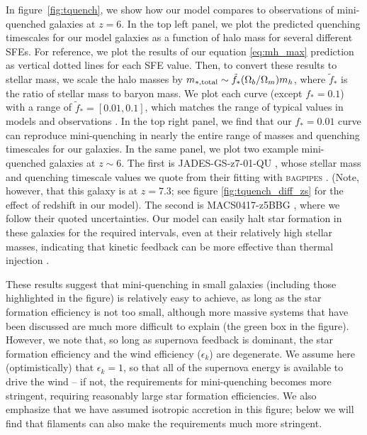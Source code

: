 \documentclass[a4paper,11pt]{article}
\begin{document}
In figure~\ref{fig:tquench}, we show how our model compares to observations of mini-quenched galaxies at $z=6$. In the top left panel, we plot the predicted quenching timescales for our model galaxies as a function of halo mass for several different SFEs. For reference, we plot the results of our equation \ref{eq:mh_max} prediction as vertical dotted lines for each SFE value. Then, to convert these results to stellar mass, we scale the halo masses by $m_{*, \rm total} \sim \tilde{f}_{*} (\Omega_{b}/\Omega_{m}) m_{h}$, where $\tilde{f}_{*}$ is the ratio of stellar mass to baryon mass. We plot each curve (except $f_{*} = 0.1$) with a range of $\tilde{f}_{*} = [0.01,0.1]$, which matches the range of typical values in models \cite{Diemer2015_colossus1, Furlanetto2017_minimalist, Prada2026} and observations \cite{Finkelstein2015}. 
In the top right panel, we find that our $f_{*} = 0.01$ curve can reproduce mini-quenching in nearly the entire range of masses and quenching timescales for our galaxies. In the same panel, we plot two example mini-quenched galaxies at $z \sim 6$. The first is JADES-GS-z7-01-QU \cite{Looser2024}, whose stellar mass and quenching timescale values we quote from their fitting with \textsc{bagpipes} \cite{Carnall2018}. (Note, however, that this galaxy is at $z = 7.3$; see figure \ref{fig:tquench_diff_zs} for the effect of redshift in our model). The second is MACS0417-z5BBG \cite{Strait2023}, where we follow their quoted uncertainties. Our model can easily halt star formation in these galaxies for the required intervals, even at their relatively high stellar masses, indicating that kinetic feedback can be more effective than thermal injection \cite{Gelli2024}. 

These results suggest that mini-quenching in small galaxies (including those highlighted in the figure) is relatively easy to achieve, as long as the star formation efficiency is not too small, although more massive systems that have been discussed are much more difficult to explain (the green box in the figure). However, we note that, so long as supernova feedback is dominant, the star formation efficiency and the wind efficiency ($\epsilon_{k}$) are degenerate. We assume here (optimistically) that $\epsilon_{k} = 1$, so that all of the supernova energy is available to drive the wind -- if not, the requirements for mini-quenching becomes more stringent, requiring reasonably large star formation efficiencies. We also emphasize that we have assumed isotropic accretion in this figure; below we will find that filaments can also make the requirements much more stringent. 
\end{document}
